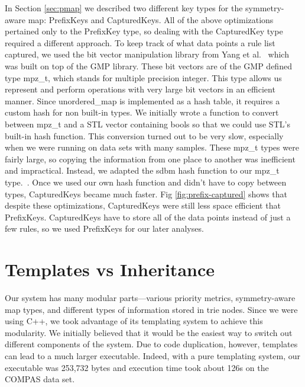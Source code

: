 In Section \ref{sec:pmap} we described two different key types for the symmetry-aware map: PrefixKeys and CapturedKeys.
All of the above optimizations pertained only to the PrefixKey type, so dealing with the CapturedKey type required a different approach.
To keep track of what data points a rule list captured, we used the bit vector manipulation library from Yang et al.~\cite{YangRuSe16} which was built on top of the GMP library.
These bit vectors are of the GMP defined type mpz\_t, which stands for multiple precision integer.
This type allows us represent and perform operations with very large bit vectors in an efficient manner.
Since unordered\_map is implemented as a hash table, it requires a custom hash for non built-in types.
We initially wrote a function to convert between mpz\_t and a STL vector containing bools so that we could use STL's built-in hash function.
This conversion turned out to be very slow, especially when we were running on data sets with many samples.
These mpz\_t types were fairly large, so copying the information from one place to another was inefficient and impractical.
Instead, we adapted the sdbm hash function to our mpz\_t type.~\cite{HashFunctions}.
Once we used our own hash function and didn't have to copy between types, CapturedKeys became much faster.
Fig \ref{fig:prefix-captured} shows that despite these optimizations, CapturedKeys were still less space efficient that PrefixKeys. 
CapturedKeys have to store all of the data points instead of just a few rules, so we used PrefixKeys for our later analyses.

\section{Templates vs Inheritance}
Our system has many modular parts---various priority metrics, symmetry-aware map types, and different types of information stored in trie nodes.
Since we were using C++, we took advantage of its templating system to achieve this modularity.
We initially believed that it would be the easiest way to switch out different components of the system.
Due to code duplication, however, templates can lead to a much larger executable.
Indeed, with a pure templating system, our executable was 253,732 bytes and execution time took about 126s on the COMPAS data set.

